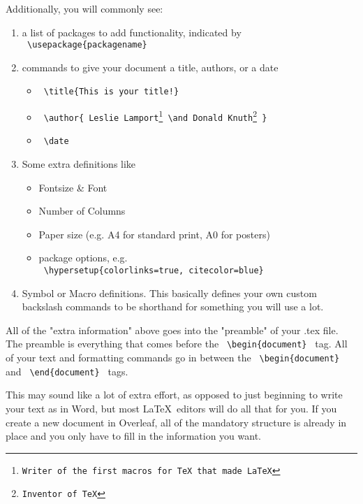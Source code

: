 \noindent Additionally, you will commonly see:

\begin{enumerate}
    \item a list of packages to add functionality, indicated by\\ \texttt{ \textbackslash usepackage\{packagename\} }
    \item commands to give your document a title, authors, or a date
        \begin{itemize}
            \item \texttt{ \textbackslash title\{This is your title!\}}
            \item \texttt{ \textbackslash author\{ Leslie Lamport\footnote{Writer of the first macros for TeX that made LaTeX} \textbackslash and Donald Knuth\footnote{Inventor of TeX} \} }
            \item \texttt{ \textbackslash date }
        \end{itemize}
    \item Some extra definitions like
        \begin{itemize}
            \item Fontsize \& Font
            \item Number of Columns
            \item Paper size (e.g. A4 for standard print, A0 for posters)
            \item package options, e.g.\\ \texttt{ \textbackslash hypersetup\{colorlinks=true, citecolor=blue\} }
        \end{itemize}
    \item Symbol or Macro definitions. This basically defines your own custom backslash commands to be shorthand for something you will use a lot.
\end{enumerate}

All of the "extra information" above goes into the "preamble" of your .tex file. The preamble is everything that comes before the \texttt{ \textbackslash begin\{document\} } tag.
All of your text and formatting commands go in between the \texttt{ \textbackslash begin\{document\} } and \texttt{ \textbackslash end\{document\} } tags.

This may sound like a lot of extra effort, as opposed to just beginning to write your text as in Word, but most \LaTeX~editors will do all that for you. If you create a new document in Overleaf, all of the mandatory structure is already in place and you only have to fill in the information you want.